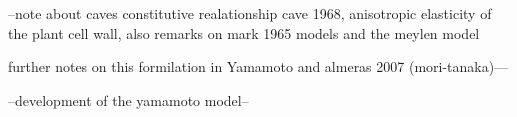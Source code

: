 --note about caves constitutive realationship cave 1968, anisotropic elasticity of the plant cell wall,\cite{Cave_1968} also remarks on mark 1965 models and the meylen model

further notes on this formilation in Yamamoto and almeras 2007 (mori-tanaka)\cite{Yamamoto_2007}---

--development of the yamamoto model--